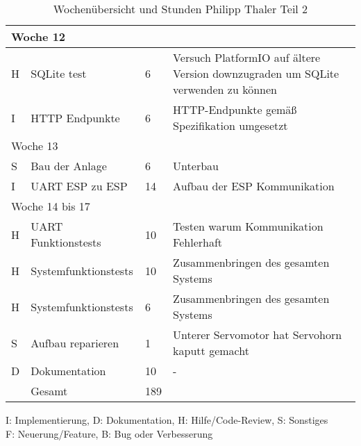 \begin{table}[!hp]
\begin{center}
\begin{tabular}{|p{0.8cm}|p{6cm}|p{0.8cm}|p{8cm}|}
            \multicolumn{4}{|l|}{Woche 12}                                                                                                                    \\ \hline
            H            & SQLite test                     & 6             & Versuch PlatformIO auf ältere Version downzugraden um SQLite verwenden zu können \\
            I            & HTTP Endpunkte                  & 6             & HTTP-Endpunkte gemäß Spezifikation umgesetzt                                     \\ \hline
            \multicolumn{4}{|l|}{Woche 13}                                                                                                                    \\ \hline
            S            & Bau der Anlage                  & 6             & Unterbau                                                                         \\
            I            & UART ESP zu ESP                 & 14            & Aufbau der ESP Kommunikation                                                     \\ \hline
            \multicolumn{4}{|l|}{Woche 14 bis 17}                                                                                                             \\ \hline
            H            & UART Funktionstests             & 10            & Testen warum Kommunikation Fehlerhaft                                            \\
            H            & Systemfunktionstests            & 10            & Zusammenbringen des gesamten Systems                                             \\
            H            & Systemfunktionstests            & 6             & Zusammenbringen des gesamten Systems                                             \\
            S            & Aufbau reparieren               & 1             & Unterer Servomotor hat Servohorn kaputt gemacht                                  \\
            D            & Dokumentation                   & 10            & -                                                                                \\ \hline
            \Xhline{3\arrayrulewidth}
                         & Gesamt                          & 189           &                                                                                  \\ \hline
        \end{tabular}
    \end{center}
    \label{tab:overviewPhilipp2}
    \caption{Wochenübersicht und Stunden Philipp Thaler Teil 2}
    I: Implementierung, D: Dokumentation, H: Hilfe/Code-Review, S: Sonstiges\\
    F: Neuerung/Feature, B: Bug oder Verbesserung
\end{table}
\vspace{1em}

\newpage